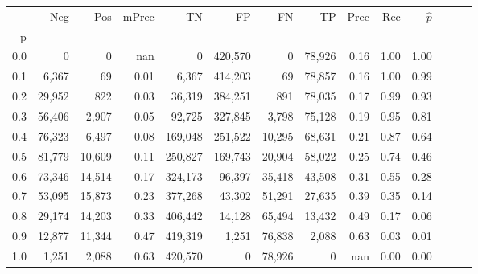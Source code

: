 \begin{tabular}{rrrrrrrrrrrrrr}
\toprule
{} &     Neg &     Pos & mPrec &       TN &       FP &      FN &      TP &  Prec &   Rec & $\hat{p}$ \\
p   &         &         &       &          &          &         &         &       &       &           \\
\midrule
0.0 &       0 &       0 &   nan &        0 &  420,570 &       0 &  78,926 &  0.16 &  1.00 &      1.00 \\
0.1 &   6,367 &      69 &  0.01 &    6,367 &  414,203 &      69 &  78,857 &  0.16 &  1.00 &      0.99 \\
0.2 &  29,952 &     822 &  0.03 &   36,319 &  384,251 &     891 &  78,035 &  0.17 &  0.99 &      0.93 \\
0.3 &  56,406 &   2,907 &  0.05 &   92,725 &  327,845 &   3,798 &  75,128 &  0.19 &  0.95 &      0.81 \\
0.4 &  76,323 &   6,497 &  0.08 &  169,048 &  251,522 &  10,295 &  68,631 &  0.21 &  0.87 &      0.64 \\
0.5 &  81,779 &  10,609 &  0.11 &  250,827 &  169,743 &  20,904 &  58,022 &  0.25 &  0.74 &      0.46 \\
0.6 &  73,346 &  14,514 &  0.17 &  324,173 &   96,397 &  35,418 &  43,508 &  0.31 &  0.55 &      0.28 \\
0.7 &  53,095 &  15,873 &  0.23 &  377,268 &   43,302 &  51,291 &  27,635 &  0.39 &  0.35 &      0.14 \\
0.8 &  29,174 &  14,203 &  0.33 &  406,442 &   14,128 &  65,494 &  13,432 &  0.49 &  0.17 &      0.06 \\
0.9 &  12,877 &  11,344 &  0.47 &  419,319 &    1,251 &  76,838 &   2,088 &  0.63 &  0.03 &      0.01 \\
1.0 &   1,251 &   2,088 &  0.63 &  420,570 &        0 &  78,926 &       0 &   nan &  0.00 &      0.00 \\
\bottomrule
\end{tabular}
